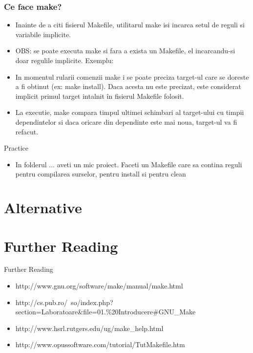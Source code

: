 \documentclass{beamer}
\begin{document}
    \begin{frame}[allowframebreaks]
    \frametitle{Ce face make?}
    \begin{itemize}
    \setlength{\itemsep}{0.6cm}
    \item Inainte de a citi fisierul Makefile, utilitarul make isi incarca setul de reguli si variabile implicite.
    \item OBS: se poate executa make si fara a exista un Makefile, el incarcandu-si doar regulile implicite. Exemplu:\\ \vspace{0.4cm}
    \item In momentul rularii comenzii make i se poate preciza target-ul care se doreste a fi obtinut (ex: make install). Daca acesta nu este precizat, este considerat implicit primul target intalnit în fisierul Makefile folosit.
    \item La executie, make compara timpul ultimei schimbari al target-ului cu timpii dependintelor si daca oricare din dependinte este mai noua, target-ul va fi refacut.
    \end{itemize}
    \end{frame}

    \begin{frame}{Practice}
    \begin{itemize}
    \item In folderul ... aveti un mic proiect. Faceti un Makefile care sa contina reguli pentru compilarea surselor, pentru install si pentru clean
    \end{itemize}
    \end{frame}

\section{Alternative}
    \frame{\tableofcontents[currentsection]}

\section{Further Reading}
    \frame{\tableofcontents[currentsection]}

    \begin{frame}{Further Reading}
    \begin{itemize}
    \item http://www.gnu.org/software/make/manual/make.html
    \item http://cs.pub.ro/~so/index.php?section=Laboratoare\&file=01.\%20Introducere\#GNU\_Make
    \item http://www.hsrl.rutgers.edu/ug/make\_help.html
    \item http://www.opussoftware.com/tutorial/TutMakefile.htm
    \end{itemize}
    \end{frame}
\end{document}

